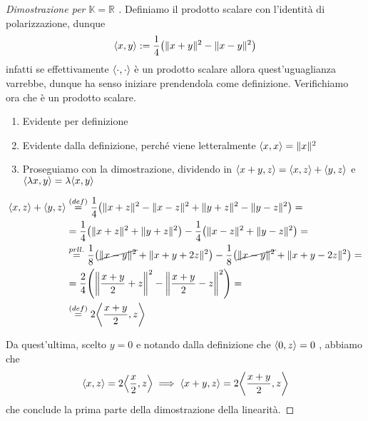 \begin{proof}[Dimostrazione per \(\mathbb{K}=\mathbb{R}\) ]
    Definiamo il prodotto scalare con l'identità di polarizzazione, dunque
    \[
      {\left\langle x,y\right\rangle} := \frac{1}{4}{\left( \|x+y\|^2 - \|x-y\|^2 \right)} 
    \]
    infatti se effettivamente \({\left\langle\cdot ,\cdot \right\rangle} \) è un prodotto scalare
    allora quest'uguaglianza varrebbe, dunque ha senso iniziare prendendola come
    definizione. Verifichiamo ora che è un prodotto scalare.
\begin{enumerate}[label = \roman*.]
    \item Evidente per definizione
    \item Evidente dalla definizione, perché viene letteralmente \({\left\langle x,x\right\rangle} = \|x\|^2\) 
    \item Proseguiamo con la dimostrazione, dividendo in \({\left\langle x+y,z\right\rangle} = {\left\langle x,z\right\rangle} +{\left\langle y,z\right\rangle} \) e \({\left\langle\lambda x,y\right\rangle} = \lambda{\left\langle x,y\right\rangle} \) 
\end{enumerate}
    \begin{align*}
        {\left\langle x,z\right\rangle} + {\left\langle y,z\right\rangle} &\overset{(def)}{=} \frac{1}{4}{\left( \|x+z\|^2 - \|x-z\|^2 + \|y+z\|^2 - \|y-z\|^2 \right)} = \\
        &= \frac{1}{4}{\left( \|x+z\|^2 + \|y+z\|^2 \right)} - \frac{1}{4}{\left( \|x-z\|^2 + \|y-z\|^2 \right)} = \\
        &\overset{prll.}{=} \frac{1}{8}{\left(\cancel{ \|x-y\|^2} + \|x+y+2z\|^2 \right)} - \frac{1}{8}{\left( \cancel{\|x- y\|^2} + \|x + y - 2z\|^2 \right)} = \\
        &= \frac{2}{4} {\left( \left\| \frac{x+y}{2}+z \right\|^2 - \left\| \frac{x+y}{2} - z
\right\|^2\right)} = \\ &\overset{(def)}{=} 2{\left\langle\frac{x+y}{2}, z\right\rangle} 
    \end{align*}

    Da quest'ultima, scelto \(y=0\) e notando dalla definizione che \({\left\langle0,z\right\rangle}=0\)  , abbiamo che
    \[
     {\left\langle x,z\right\rangle} = 2{\left\langle\frac{x}{2}, z\right\rangle} \implies {\left\langle x+y, z\right\rangle} = 2{\left\langle\frac{x+y}{2}, z\right\rangle} 
    \]
    che conclude la prima parte della dimostrazione della linearità.


\end{proof}
